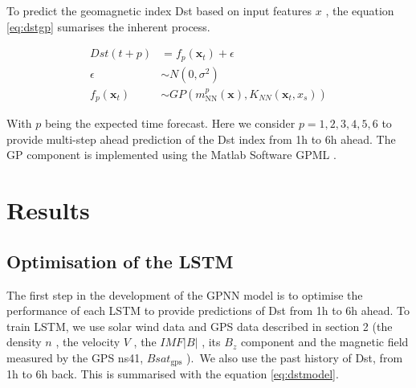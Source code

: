 

To predict the geomagnetic index Dst based on input features \( x \) , the equation \ref{eq:dstgp} sumarises 
the inherent process. 



\begin{align}\label{eq:dstgp}
Dst \left( t+p \right) &= f_{p} \left( \mathbf{x}_{t} \right) + \epsilon \\ 
\epsilon &\sim N \left( 0, \sigma ^{2} \right)  \\
f_{p} \left( \mathbf{x}_{t} \right)  &\sim GP \left( m^{p}_{\text{NN}}(\mathbf{x}) , K_{NN}(\mathbf{x}_{t}, x_{s} ) \right)
\end{align}

With  \( p \)  being the expected time forecast. Here we consider $p  = {1,2,3,4,5,6}$ to provide 
multi-step ahead prediction of the Dst index from 1h to 6h ahead. The GP component is implemented using the 
Matlab Software GPML \citep{rasmussen2010gaussian}.


\section{Results} \label{sec:resultsgpnn}


\subsection{Optimisation of the LSTM}


The first step in the development of the GPNN model is to optimise the performance of each 
LSTM to provide predictions of Dst from 1h to 6h ahead. To train LSTM, we use solar wind data and 
GPS data described in section 2 (the density \(  n \) , the velocity  \( V \) , the  
\( IMF  \vert B \vert  \) , its  \( B_{z} \)  component and the magnetic field measured 
by the GPS ns41,  \( Bsat_{\text{gps}} \) ).\ We also use the past history of Dst, from 1h  to 6h back. 
This is summarised with the equation \ref{eq:dstmodel}.



